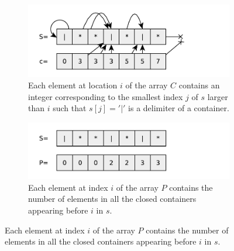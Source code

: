 \begin{figure}
	\centering
	\begin{subfigure}[t]{0.48\textwidth}
		\includegraphics[width=1\linewidth]{sources/items_in_containers_amazon/images/delimiter_on_right}
		\caption{Each element at location $i$ of the array $C$ contains an integer corresponding to the smallest index $j$ of $s$ larger than $i$ such that $s[j]='|'$ is a delimiter of a container.}
		\label{fig:items_in_containers_amazon:delimiter_right}
	 \end{subfigure}
	\hfill
	\begin{subfigure}[t]{0.48\textwidth}
		\includegraphics[width=1\linewidth]{sources/items_in_containers_amazon/images/prefix_sum}
		\caption{Each element at index $i$ of the array $P$ contains the number of elements in all the closed containers appearing before $i$ in $s$.  }
		\label{fig:items_in_containers_amazon:prefix_sum}
	 \end{subfigure}
	 \label{fig:items_in_containers_amazon:example_prefix}
\end{figure}	 


